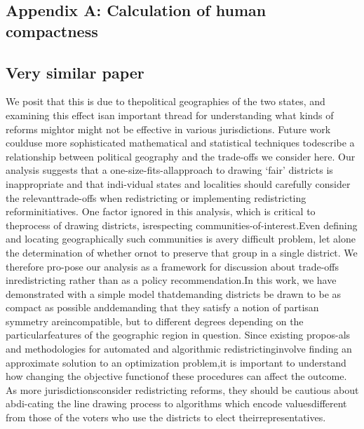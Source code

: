 \documentclass[]{article}
\begin{document}
\hypertarget{appendix-a-calculation-of-human-compactness}{%
\subsection{Appendix A: Calculation of human
compactness}\label{appendix-a-calculation-of-human-compactness}}

\hypertarget{very-similar-paper}{%
\subsection{Very similar paper}\label{very-similar-paper}}

We posit that this is due to thepolitical geographies of the two states,
and examining this effect isan important thread for understanding what
kinds of reforms mightor might not be effective in various
jurisdictions. Future work coulduse more sophisticated mathematical and
statistical techniques todescribe a relationship between political
geography and the trade-offs we consider here. Our analysis suggests
that a one-size-fits-allapproach to drawing `fair' districts is
inappropriate and that indi-vidual states and localities should
carefully consider the relevanttrade-offs when redistricting or
implementing redistricting reforminitiatives. One factor ignored in this
analysis, which is critical to theprocess of drawing districts,
isrespecting communities-of-interest.Even defining and locating
geographically such communities is avery difficult problem, let alone
the determination of whether ornot to preserve that group in a single
district. We therefore pro-pose our analysis as a framework for
discussion about trade-offs inredistricting rather than as a policy
recommendation.In this work, we have demonstrated with a simple model
thatdemanding districts be drawn to be as compact as possible
anddemanding that they satisfy a notion of partisan symmetry
areincompatible, but to different degrees depending on the
particularfeatures of the geographic region in question. Since existing
propos-als and methodologies for automated and algorithmic
redistrictinginvolve finding an approximate solution to an optimization
problem,it is important to understand how changing the objective
functionof these procedures can affect the outcome. As more
jurisdictionsconsider redistricting reforms, they should be cautious
about abdi-cating the line drawing process to algorithms which encode
valuesdifferent from those of the voters who use the districts to elect
theirrepresentatives.


\end{document}
